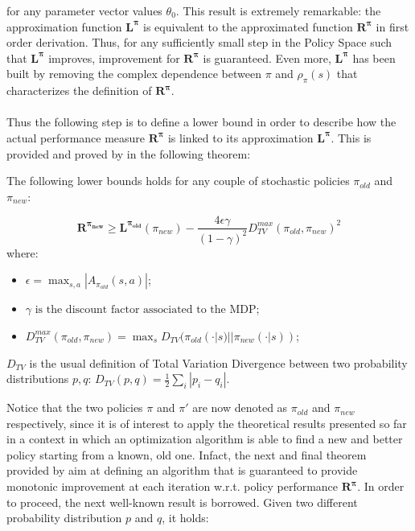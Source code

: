                 for any parameter vector values $\theta_0$. This result is extremely remarkable: the approximation function $\mathbf{L^{\pi}}$ is equivalent to the approximated function $\mathbf{R^{\pi}}$ in first order derivation. Thus, for any sufficiently small step in the Policy Space such that $\mathbf{L^{\pi}}$ improves, improvement for $\mathbf{R^{\pi}}$ is guaranteed. Even more, $\mathbf{L^{\pi}}$ has been built by removing the complex dependence between $\pi$ and $\rho_{\pi}(s)$ that characterizes the definition of $\mathbf{R^{\pi}}$.
                \\\\
                Thus the following step is to define a lower bound in order to describe how the actual performance measure $\mathbf{R^{\pi}}$ is linked to its approximation $\mathbf{L^{\pi}}$. This is provided and proved by  in the following theorem:
                
                \begin{theorem}
                    \label{th:trpo_dtvbound}
                    The following lower bounds holds for any couple of stochastic policies $\pi_{old}$ and $\pi_{new}$:
                    
                    \[ \mathbf{R^{\pi_{new}}} \geq \mathbf{L^{\pi_{old}}}(\pi_{new}) - \frac{4 \epsilon \gamma}{\left( 1 - \gamma \right)^2} D_{TV}^{max}(\pi_{old}, \pi_{new})^2\]
                    where:
                    \begin{itemize}
                        \item $\epsilon = \max_{s, a} | A_{\pi_{old}}(s, a) |$;
                        \item $\gamma \text{ is the discount factor associated to the MDP}$;
                        \item $D_{TV}^{max}(\pi_{old}, \pi_{new}) = \max_{s} D_{TV} (\pi_{old}(\cdot | s) || \pi_{new}(\cdot | s))$;
                    \end{itemize}
                    $D_{TV}$ is the usual definition of Total Variation Divergence between two probability distributions $p, q$: $D_{TV} (p,q) = \frac{1}{2} \sum_{i} | p_i - q_i |$.
                \end{theorem}
                
                Notice that the two policies $\pi$ and $\pi'$ are now denoted as $\pi_{old}$ and $\pi_{new}$ respectively, since it is of interest to apply the theoretical results presented so far in a context in which an optimization algorithm is able to find a new and better policy starting from a known, old one. Infact, the next and final theorem provided by  aim at defining an algorithm that is guaranteed to provide monotonic improvement at each iteration w.r.t. policy performance $\mathbf{R^{\pi}}$. \newline
                In order to proceed, the next well-known result is borrowed. Given two different probability distribution $p$ and $q$, it holds:
                
